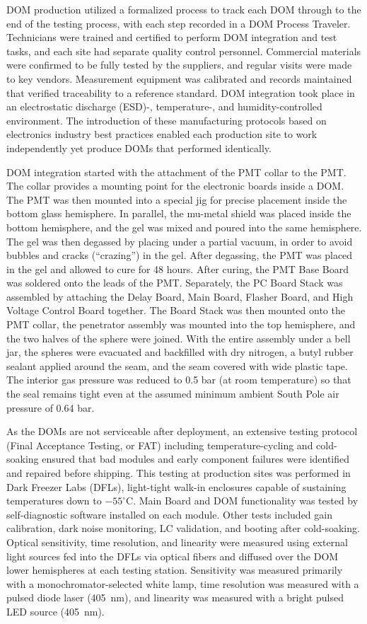 DOM production utilized a formalized process to track each DOM through to
the end of the testing process, with each step recorded in a DOM Process
Traveler.  Technicians were trained and certified to perform DOM
integration and test tasks, and each site had separate quality control
personnel. Commercial materials were confirmed to be fully tested by the
suppliers, and regular visits were made to key vendors.  Measurement
equipment was calibrated and records maintained that verified
traceability to a reference standard.  DOM integration took place in
an electrostatic discharge (ESD)-, temperature-, and humidity-controlled environment.  The introduction
of these manufacturing protocols based on electronics industry best
practices enabled each production site to work independently yet
produce DOMs that performed identically.

DOM integration started with the attachment of the PMT collar
to the PMT.  The collar provides a mounting point for the electronic boards inside
a DOM. The PMT was then mounted into a special jig for precise
placement inside the bottom glass hemisphere.  In parallel, the mu-metal
shield was placed inside the bottom hemisphere, and the
gel was mixed and poured into the same hemisphere. The gel was then
degassed by placing under a partial vacuum, in order to avoid bubbles and
cracks (``crazing'') in the gel. 
After degassing, the PMT was placed in the gel and allowed to cure for 48
hours.  After curing, the PMT Base Board was soldered onto the leads of the
PMT.  Separately, the PC Board Stack was assembled by attaching the Delay
Board, Main Board, Flasher Board, and High Voltage Control Board together.
The Board Stack was then mounted onto the PMT collar, the penetrator assembly
was mounted into the top hemisphere, and the two halves of the sphere were
joined.  With the entire assembly under a bell jar, the spheres were
evacuated and backfilled with dry nitrogen, 
a butyl rubber sealant applied around the seam, and the seam covered with
wide plastic tape. The interior gas pressure was reduced to 0.5 bar (at
room temperature) so that the seal remains tight even at the assumed minimum
ambient South Pole air pressure of 0.64 bar.

As the DOMs are not serviceable after deployment, an extensive testing
protocol (Final Acceptance Testing, or FAT) including temperature-cycling
and cold-soaking ensured that bad modules and early component failures were
identified and repaired before shipping.  This testing at production sites
was performed in Dark Freezer Labs (DFLs), light-tight walk-in 
enclosures capable of sustaining temperatures down to $-55^\circ$C.  Main Board
and DOM functionality was tested by self-diagnostic software installed on
each module.  Other tests included gain calibration, dark noise monitoring,
LC validation, and booting after cold-soaking.  Optical sensitivity, time resolution,
and linearity were measured using external light sources fed into the DFLs
via optical fibers and diffused over the DOM lower hemispheres at each
testing station. Sensitivity was measured primarily with a
monochromator-selected white lamp, time resolution was measured with a
pulsed diode laser (405~nm), and linearity was measured with a bright
pulsed LED source (405~nm).

